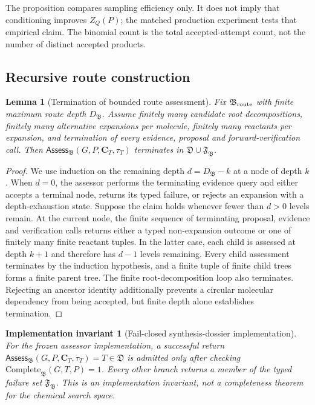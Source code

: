 \documentclass{article}
\newtheorem{lemma}[theorem]{Lemma}
\newtheorem{invariant}[theorem]{Implementation invariant}
\begin{document}
The proposition compares sampling efficiency only.
It does not imply that conditioning improves $Z_Q(P)$; the matched production experiment tests that
empirical claim. The binomial count is the total accepted-attempt count, not the number of distinct
accepted products.

\subsection{Recursive route construction}

\begin{lemma}[Termination of bounded route assessment]
\label{lem:planner-termination}
Fix $\mathfrak B_{\rm route}$ with finite maximum route depth $D_{\mathfrak B}$. Assume finitely many
candidate root decompositions, finitely many alternative expansions per molecule, finitely many
reactants per expansion, and termination of every evidence, proposal and forward-verification call.
Then $\mathsf{Assess}_{\mathfrak B}(G,P,\mathbf C_T,\tau_T)$ terminates in
$\mathfrak D\cup\mathfrak F_{\mathfrak B}$.
\end{lemma}

\begin{proof}
We use induction on the remaining depth $d=D_{\mathfrak B}-k$ at a node of depth $k$.
When $d=0$, the assessor performs the terminating evidence query and either accepts a terminal node,
returns its typed failure, or rejects an expansion with a depth-exhaustion state.
Suppose the claim holds whenever fewer than $d>0$ levels remain.
At the current node, the finite sequence of terminating proposal, evidence and verification calls
returns either a typed non-expansion outcome or one of finitely many finite reactant tuples. In the
latter case, each child is assessed at depth $k+1$ and therefore has $d-1$ levels remaining. Every
child assessment terminates by the induction hypothesis, and a finite tuple of finite child trees
forms a finite parent tree. The finite root-decomposition loop also terminates.
Rejecting an ancestor identity additionally prevents a circular molecular dependency from being
accepted, but finite depth alone establishes termination.
\end{proof}

\begin{invariant}[Fail-closed synthesis-dossier implementation]
\label{inv:dossier-soundness}
For the frozen assessor implementation, a successful return
$\mathsf{Assess}_{\mathfrak B}(G,P,\mathbf C_T,\tau_T)=T\in\mathfrak D$ is admitted only after checking
$\mathrm{Complete}_{\mathfrak B}(G,T,P)=1$. Every other branch returns a member of the typed failure
set $\mathfrak F_{\mathfrak B}$. This is an implementation invariant, not a completeness theorem for
the chemical search space.
\end{invariant}
\end{document}
